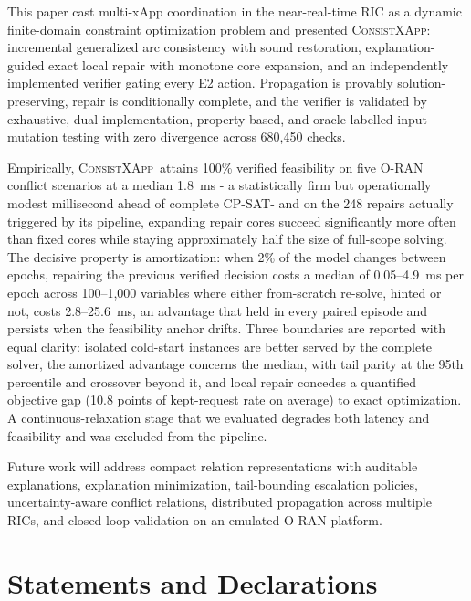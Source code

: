 \documentclass[pdflatex,sn-mathphys-num,iicol,oneside]{sn-jnl}
\newcommand{\method}{\textsc{ConsistXApp}}
\newcommand{\cpsat}{\textsc{CP-SAT}}
\begin{document}
This paper cast multi-xApp coordination in the near-real-time RIC as
a dynamic finite-domain constraint optimization problem and presented
\method: incremental generalized arc consistency with sound
restoration, explanation-guided exact local repair with monotone core
expansion, and an independently implemented verifier gating every E2
action. Propagation is provably solution-preserving, repair is
conditionally complete, and the verifier is validated by exhaustive,
dual-implementation, property-based, and oracle-labelled
input-mutation testing with zero divergence across 680{,}450 checks.

Empirically, \method\ attains 100\% verified feasibility on five
O-RAN conflict scenarios at a median 1.8~ms - a statistically firm but
operationally modest millisecond ahead of complete \cpsat - and on the
248 repairs actually triggered by its pipeline, expanding repair cores
succeed significantly more often than fixed cores while staying
approximately half the size of full-scope solving. The decisive property is
amortization: when 2\% of the model changes between epochs, repairing
the previous verified decision costs a median of 0.05--4.9~ms per
epoch across 100--1{,}000 variables where either from-scratch re-solve,
hinted or not, costs 2.8--25.6~ms, an advantage that held in every
paired episode and persists when the feasibility anchor drifts. Three
boundaries are reported with equal clarity: isolated cold-start
instances are better served by the complete solver, the amortized
advantage concerns the median, with tail parity at the 95th percentile
and crossover beyond it, and local repair concedes a quantified
objective gap (10.8 points of kept-request rate on average) to exact
optimization. A continuous-relaxation stage that we evaluated degrades
both latency and feasibility and was excluded from the pipeline.

Future work will address compact relation representations with
auditable explanations, explanation minimization, tail-bounding
escalation policies, uncertainty-aware conflict relations, distributed
propagation across multiple RICs, and closed-loop validation on an
emulated O-RAN platform.

\section*{Statements and Declarations}
\end{document}
